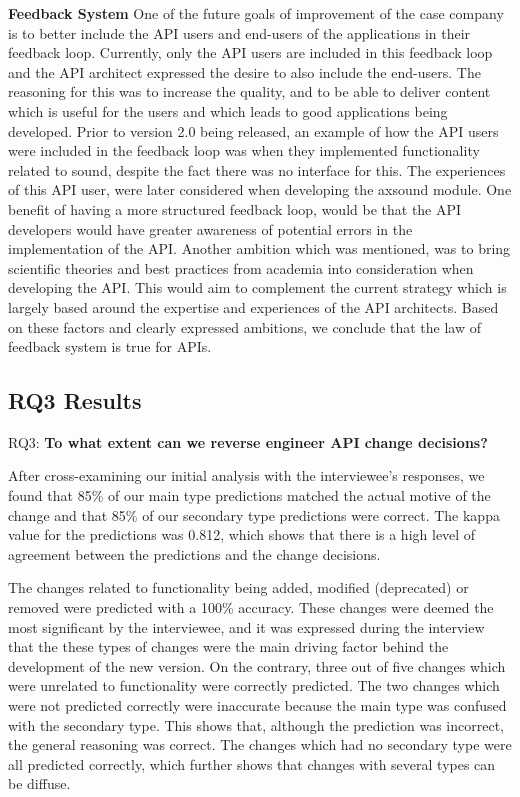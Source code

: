 \documentclass{sig-alternate}
\begin{document}
\smallskip \noindent
\textbf{Feedback System  } 
One of the future goals of improvement of the case company is to better include the API users and end-users of the applications in their feedback loop. Currently, only the API users are included in this feedback loop and the API architect expressed the desire to also include the end-users. The reasoning for this was to increase the quality, and to be able to deliver content which is useful for the users and which leads to good applications being developed. Prior to version 2.0 being released, an example of how the API users were included in the feedback loop was when they implemented functionality related to sound, despite the fact there was no interface for this.  The experiences of this API user, were later considered when developing the axsound module. One benefit of having a more structured feedback loop, would be that the API developers would have greater awareness of potential errors in the implementation of the API. Another ambition which was mentioned, was to bring scientific theories and best practices from academia into consideration when developing the API. This would aim to complement the current strategy which is largely based around the expertise and experiences of the API architects. Based on these factors and clearly expressed ambitions, we conclude that the law of feedback system is true for APIs. 



\subsection{RQ3 Results}
\noindent
RQ3: \textbf{To what extent can we reverse engineer API change decisions?}
\smallskip

After cross-examining our initial analysis with the interviewee's responses, we found that 85\% of our main type predictions matched the actual motive of the change and that 85\% of our secondary type predictions were correct. The kappa value \cite{cohen1968weighted} for the predictions was 0.812, which shows that there is a high level of agreement between the predictions and the change decisions. 

The changes related to functionality being added, modified (deprecated) or removed were predicted with a 100\% accuracy. These changes were deemed the most significant by the interviewee, and it was expressed during the interview that the these types of changes were the main driving factor behind the development of the new version. On the contrary, three out of five changes which were unrelated to functionality were correctly predicted. The two changes which were not predicted correctly were inaccurate because the main type was confused with the secondary type. This shows that, although the prediction was incorrect, the general reasoning was correct. The changes which had no secondary type were all predicted correctly, which further shows that changes with several types can be diffuse. 
\end{document}
